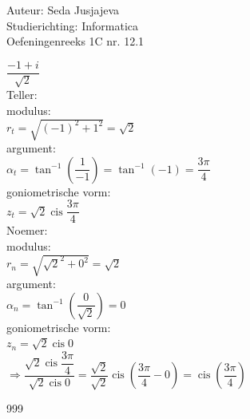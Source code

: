 \documentclass[a4paper]{article}
\begin{document}
\noindent \large Auteur: Seda Jusjajeva\\
\noindent \large Studierichting: Informatica\\
\noindent \large Oefeningenreeks 1C nr. 12.1\\

\medskip

\normalsize

$\dfrac{-1 + i}{\sqrt{2}}$ \\

Teller: \\

modulus: \\

$r_t = \sqrt{(-1)^2 + 1^2} = \sqrt{2}$ \\

argument: \\

$\alpha_t = \tan^{-1}\left(\dfrac{1}{-1}\right) = \tan^{-1}(-1) = \dfrac{3 \pi}{4}$ \\

goniometrische vorm: \\

$z_t = \sqrt{2}\operatorname{cis}\dfrac{3\pi}{4}$ \\

Noemer: \\

modulus: \\

$r_n = \sqrt{\sqrt{2}^2 + 0^2} = \sqrt{2}$\\

argument: \\

$\alpha_n = \tan^{-1}\left(\dfrac{0}{\sqrt{2}}\right) = 0$ \\

goniometrische vorm: \\

$z_n = \sqrt{2}\operatorname{cis}0$ \\

$\Rightarrow\dfrac{\sqrt{2}\operatorname{cis}\dfrac{3\pi}{4}}{\sqrt{2}\operatorname{cis}0} = \dfrac{\sqrt{2}}{\sqrt{2}}\operatorname{cis}\left(\dfrac{3\pi}{4}-0\right) = \operatorname{cis}\left(\dfrac{3\pi}{4}\right)$ \\




\begin{thebibliography}{999}
\end{thebibliography}
\end{document}
